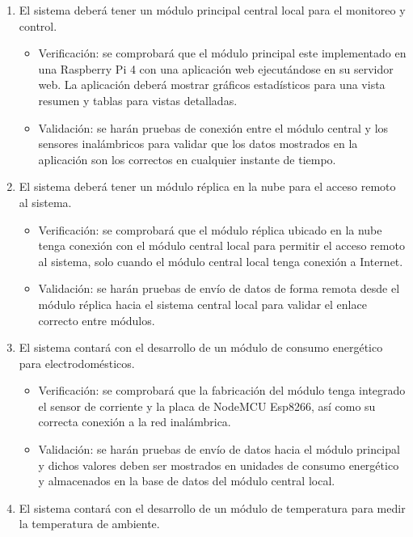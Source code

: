 \documentclass[11pt]{charter}
\begin{document}
\begin{enumerate}
\item El sistema deberá tener un módulo principal central local para el monitoreo y control.

\begin{itemize}
\item Verificación: se comprobará que el módulo principal este implementado en una Raspberry Pi 4 con una aplicación web ejecutándose en su servidor web. La aplicación deberá mostrar gráficos estadísticos para una vista resumen y tablas para vistas detalladas. 
\item Validación: se harán pruebas de conexión entre el módulo central y los sensores inalámbricos para validar que los datos mostrados en la aplicación son los correctos en cualquier instante de tiempo. 
\end{itemize}

\item El sistema deberá tener un módulo réplica en la nube para el acceso remoto al sistema.

\begin{itemize}
\item Verificación: se comprobará que el módulo réplica ubicado en la nube tenga conexión con el módulo central local para permitir el acceso remoto al sistema, solo cuando el módulo central local tenga conexión a Internet.
\item Validación: se harán pruebas de envío de datos de forma remota desde el módulo réplica hacia el sistema central local para validar el enlace correcto entre módulos.  
\end{itemize}

\item El sistema contará con el desarrollo de un módulo de consumo energético para electrodomésticos.

\begin{itemize}
\item Verificación: se comprobará que la fabricación del módulo tenga integrado el sensor de corriente y la placa de NodeMCU Esp8266, así como su correcta conexión a la red inalámbrica.
\item Validación: se harán pruebas de envío de datos hacia el módulo principal y dichos valores deben ser mostrados en unidades de consumo energético y almacenados en la base de datos del módulo central local.
\end{itemize}

\item El sistema contará con el desarrollo de un módulo de temperatura para medir la temperatura de ambiente.


\end{enumerate}
\end{document}
